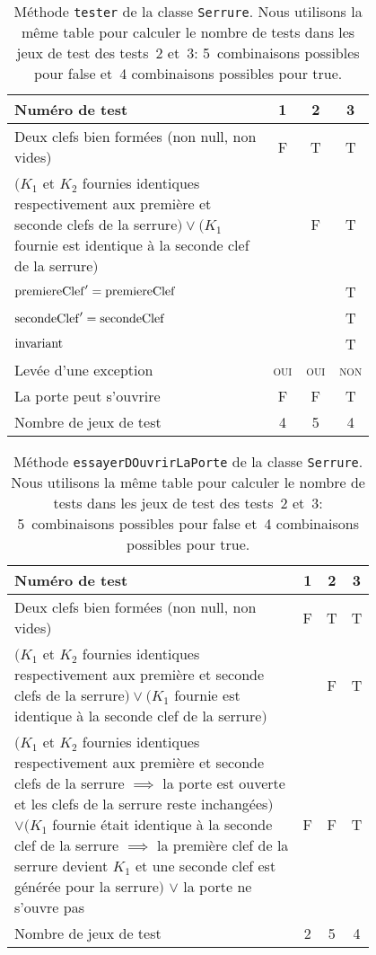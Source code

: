\documentclass[11pt,article]{article}
\newcommand{\nullvalue}{\textsf{null}\xspace}
\newcommand{\invariant}{\ensuremath\mathrm{invariant}}
\begin{document}
\begin{table}[htbp!]
\begin{center}
\begin{tabular}{|p{0.8\linewidth}|c|c|c|}
\hline
Numéro de test
&1&2&3\\
\hline
\hline
Deux clefs bien formées (non \nullvalue, non vides)
&F&T&T\\
\hline
{\small$(K_1$ et $K_2$ fournies identiques respectivement aux
première et seconde clefs de la serrure$) \lor (K_1$ fournie est
identique à la seconde clef de la serrure$)$}
& &F&T\\
\hline
\hline
$\mathrm{premiereClef}' = \mathrm{premiereClef}$
& & &T\\
\hline
$\mathrm{secondeClef}' = \mathrm{secondeClef}$
& & &T\\
\hline
$\invariant$
& & &T\\
\hline
Levée d'une exception&\textsc{oui}&\textsc{oui}&\textsc{non}\\
\hline
\hline
La porte peut s'ouvrire
&F&F&T\\
\hline
\hline
Nombre de jeux de test 
&4&5&4\\
\hline
\end{tabular}
\caption{Méthode \texttt{tester} de la classe
  \texttt{Serrure}. Nous utilisons la même table pour calculer le
  nombre de tests dans les jeux de test des tests~2 et~3:
  5~combinaisons possibles pour \textsf{false} et~4 combinaisons
  possibles pour \textsf{true}.}
\end{center}
\end{table}

\begin{table}[htbp!]
\begin{center}
\begin{tabular}{|p{0.8\linewidth}|c|c|c|}
\hline
Numéro de test
&1&2&3\\
\hline
\hline
Deux clefs bien formées (non \nullvalue, non vides)
&F&T&T\\
\hline
{\small$(K_1$ et $K_2$ fournies identiques respectivement aux
première et seconde clefs de la serrure$) \lor (K_1$ fournie est
identique à la seconde clef de la serrure$)$}
& &F&T\\
\hline
{\small
$\bigl(K_1$ et $K_2$ fournies identiques respectivement aux
première et seconde clefs de la serrure $\implies$ la porte est
ouverte et les clefs de la serrure reste inchangées$\bigr)$
\newline
$\lor\bigl(K_1$ fournie était identique à la
seconde clef de la serrure $\implies$ la première clef de la serrure
devient $K_1$ et une seconde clef est générée pour la serrure$\bigr)$
\newline
$\lor$ la porte ne s'ouvre pas}
&F&F&T\\
\hline
\hline
Nombre de jeux de test
&2&5&4\\
\hline
\end{tabular}
\caption{Méthode \texttt{essayerDOuvrirLaPorte} de la classe
  \texttt{Serrure}. Nous utilisons la même table pour calculer le
  nombre de tests dans les jeux de test des tests~2 et~3:
  5~combinaisons possibles pour \textsf{false} et~4 combinaisons
  possibles pour \textsf{true}.}
\end{center}
\end{table}
\end{document}
